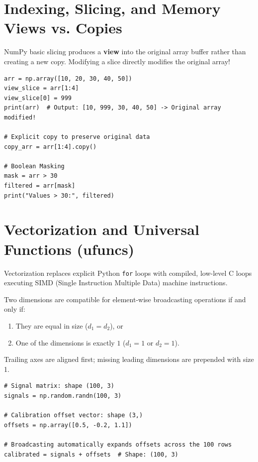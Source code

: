 \section{Indexing, Slicing, and Memory Views vs. Copies}

NumPy basic slicing produces a \textbf{view} into the original array buffer rather than creating a new copy. Modifying a slice directly modifies the original array!

\begin{lstlisting}[caption={Views vs. Deep Copies and Fancy Masking}]
arr = np.array([10, 20, 30, 40, 50])
view_slice = arr[1:4]
view_slice[0] = 999
print(arr)  # Output: [10, 999, 30, 40, 50] -> Original array modified!

# Explicit copy to preserve original data
copy_arr = arr[1:4].copy()

# Boolean Masking
mask = arr > 30
filtered = arr[mask]
print("Values > 30:", filtered)
\end{lstlisting}

\section{Vectorization and Universal Functions (ufuncs)}

Vectorization replaces explicit Python \texttt{for} loops with compiled, low-level C loops executing SIMD (Single Instruction Multiple Data) machine instructions.

\begin{keyequation}
Two dimensions are compatible for element-wise broadcasting operations if and only if:
\begin{enumerate}[leftmargin=1.8em, itemsep=2pt]
    \item They are equal in size ($d_1 = d_2$), or
    \item One of the dimensions is exactly $1$ ($d_1 = 1$ or $d_2 = 1$).
\end{enumerate}
Trailing axes are aligned first; missing leading dimensions are prepended with size 1.
\end{keyequation}

\begin{lstlisting}[caption={Broadcasting Demonstration}]
# Signal matrix: shape (100, 3)
signals = np.random.randn(100, 3)

# Calibration offset vector: shape (3,)
offsets = np.array([0.5, -0.2, 1.1])

# Broadcasting automatically expands offsets across the 100 rows
calibrated = signals + offsets  # Shape: (100, 3)
\end{lstlisting}

